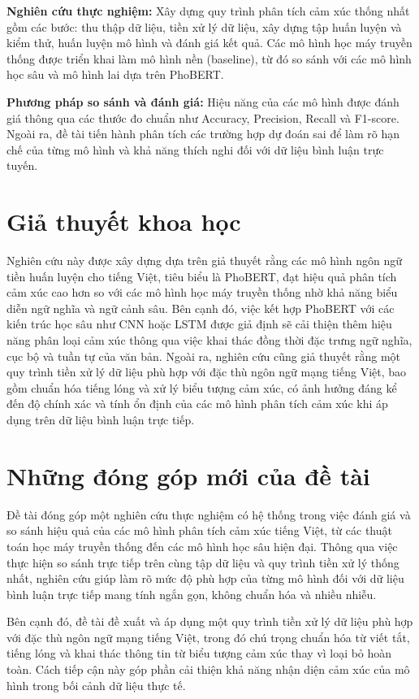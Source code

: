 \documentclass[14pt, a4paper]{report}
\begin{document}
\textbf{Nghiên cứu thực nghiệm:} Xây dựng quy trình phân tích cảm xúc thống nhất gồm các bước: thu thập dữ liệu, tiền xử lý dữ liệu, xây dựng tập huấn luyện và kiểm thử, huấn luyện mô hình và đánh giá kết quả. Các mô hình học máy truyền thống được triển khai làm mô hình nền (baseline), từ đó so sánh với các mô hình học sâu và mô hình lai dựa trên PhoBERT.

\textbf{Phương pháp so sánh và đánh giá:} Hiệu năng của các mô hình được đánh giá thông qua các thước đo chuẩn như Accuracy, Precision, Recall và F1-score. Ngoài ra, đề tài tiến hành phân tích các trường hợp dự đoán sai để làm rõ hạn chế của từng mô hình và khả năng thích nghi đối với dữ liệu bình luận trực tuyến.

\section{Giả thuyết khoa học}

Nghiên cứu này được xây dựng dựa trên giả thuyết rằng các mô hình ngôn ngữ tiền huấn luyện cho tiếng Việt, tiêu biểu là PhoBERT, đạt hiệu quả phân tích cảm xúc cao hơn so với các mô hình học máy truyền thống nhờ khả năng biểu diễn ngữ nghĩa và ngữ cảnh sâu. Bên cạnh đó, việc kết hợp PhoBERT với các kiến trúc học sâu như CNN hoặc LSTM được giả định sẽ cải thiện thêm hiệu năng phân loại cảm xúc thông qua việc khai thác đồng thời đặc trưng ngữ nghĩa, cục bộ và tuần tự của văn bản. Ngoài ra, nghiên cứu cũng giả thuyết rằng một quy trình tiền xử lý dữ liệu phù hợp với đặc thù ngôn ngữ mạng tiếng Việt, bao gồm chuẩn hóa tiếng lóng và xử lý biểu tượng cảm xúc, có ảnh hưởng đáng kể đến độ chính xác và tính ổn định của các mô hình phân tích cảm xúc khi áp dụng trên dữ liệu bình luận trực tiếp.

\section{Những đóng góp mới của đề tài}

Đề tài đóng góp một nghiên cứu thực nghiệm có hệ thống trong việc đánh giá và so sánh hiệu quả của các mô hình phân tích cảm xúc tiếng Việt, từ các thuật toán học máy truyền thống đến các mô hình học sâu hiện đại. Thông qua việc thực hiện so sánh trực tiếp trên cùng tập dữ liệu và quy trình tiền xử lý thống nhất, nghiên cứu giúp làm rõ mức độ phù hợp của từng mô hình đối với dữ liệu bình luận trực tiếp mang tính ngắn gọn, không chuẩn hóa và nhiều nhiễu.

Bên cạnh đó, đề tài đề xuất và áp dụng một quy trình tiền xử lý dữ liệu phù hợp với đặc thù ngôn ngữ mạng tiếng Việt, trong đó chú trọng chuẩn hóa từ viết tắt, tiếng lóng và khai thác thông tin từ biểu tượng cảm xúc thay vì loại bỏ hoàn toàn. Cách tiếp cận này góp phần cải thiện khả năng nhận diện cảm xúc của mô hình trong bối cảnh dữ liệu thực tế.
\end{document}
